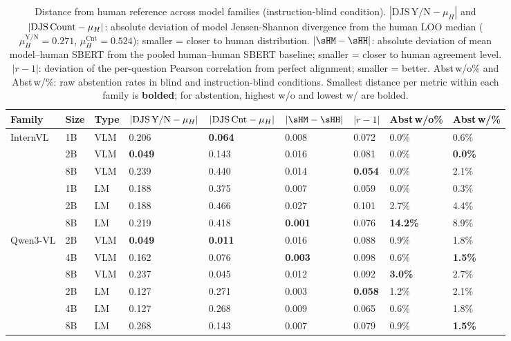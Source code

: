 \begin{table}[ht]
\small
\centering
\caption{Distance from human reference across model families (instruction-blind condition).
$|\text{DJS}\,\text{Y/N} - \mu_H|$ and $|\text{DJS\,Count} - \mu_H|$: absolute deviation of model Jensen-Shannon divergence from the human LOO median ($\mu_H^{\text{Y/N}}=0.271$, $\mu_H^{\text{Cnt}}=0.524$); smaller = closer to human distribution.
$|\sHM - \sHH|$: absolute deviation of mean model--human SBERT from the pooled human--human SBERT baseline; smaller = closer to human agreement level.
$|r - 1|$: deviation of the per-question Pearson correlation from perfect alignment; smaller = better.
Abst\,w/o\% and Abst\,w/\%: raw abstention rates in blind and instruction-blind conditions.
Smallest distance per metric within each family is \textbf{bolded}; for abstention, highest w/o and lowest w/ are bolded.}
\label{tab:scale_alignment}
\begin{tabular}{lllllllll}
\toprule
Family & Size & Type & $|\text{DJS\,Y/N} - \mu_H|$ & $|\text{DJS\,Cnt} - \mu_H|$ & $|\sHM - \sHH|$ & $|r - 1|$ & Abst\,w/o\% & Abst\,w/\% \\
\midrule
    \multirow{6}{*}{InternVL} & 1B & VLM & 0.206 & \textbf{0.064} & 0.008 & 0.072 & 0.0\% & 0.6\% \\
     & 2B & VLM & \textbf{0.049} & 0.143 & 0.016 & 0.081 & 0.0\% & \textbf{0.0\%} \\
     & 8B & VLM & 0.239 & 0.440 & 0.014 & \textbf{0.054} & 0.0\% & 2.1\% \\
     & 1B & LM & 0.188 & 0.375 & 0.007 & 0.059 & 0.0\% & 0.3\% \\
     & 2B & LM & 0.188 & 0.466 & 0.027 & 0.101 & 2.7\% & 4.4\% \\
     & 8B & LM & 0.219 & 0.418 & \textbf{0.001} & 0.076 & \textbf{14.2\%} & 8.9\% \\
    \midrule
    \multirow{6}{*}{Qwen3-VL} & 2B & VLM & \textbf{0.049} & \textbf{0.011} & 0.016 & 0.088 & 0.9\% & 1.8\% \\
     & 4B & VLM & 0.162 & 0.076 & \textbf{0.003} & 0.098 & 0.6\% & \textbf{1.5\%} \\
     & 8B & VLM & 0.237 & 0.045 & 0.012 & 0.092 & \textbf{3.0\%} & 2.7\% \\
     & 2B & LM & 0.127 & 0.271 & 0.003 & \textbf{0.058} & 1.2\% & 2.1\% \\
     & 4B & LM & 0.127 & 0.268 & 0.009 & 0.065 & 0.6\% & 1.8\% \\
     & 8B & LM & 0.268 & 0.143 & 0.007 & 0.079 & 0.9\% & \textbf{1.5\%} \\

\end{tabular}
\end{table}
